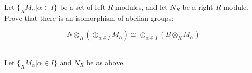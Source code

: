 Let $\{_RM_{\alpha}|\alpha\in I\}$ be a set of left $R$-modules, and let $N_R$ be a right $R$-module.
Prove that there is an isomorphism of abelian groups: 

$$N\otimes_R(\oplus_{\alpha\in I}M_{\alpha})\cong\oplus_{\alpha\in I}(B\otimes_RM_{\alpha})$$

\begin{solution}\renewcommand{\qedsymbol}{}\ \\
    Let $\{_RM_{\alpha}|\alpha\in I\}$ and $N_R$ be as above.
\end{solution}